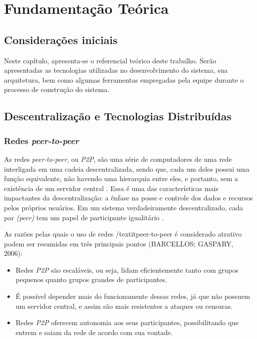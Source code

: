\chapter[Fundamentação Teórica]{Fundamentação Teórica}
\label{cap:fundamentacao}

\section{Considerações iniciais}
Neste capítulo, apresenta-se o referencial teórico deste trabalho. Serão apresentadas as tecnologias utilizadas no desenvolvimento do sistema, sua arquitetura, bem como algumas ferramentas empregadas pela equipe durante o processo de construção do sistema.

\section{Descentralização e Tecnologias Distribuídas}
\subsection{Redes \textit{peer-to-peer}}
As redes \textit{peer-to-peer}, ou \textit{P2P}, são uma série de computadores de uma rede interligada em uma cadeia descentralizada, sendo que, cada um deles possui uma função equivalente, não havendo uma hierarquia entre eles, e portanto, sem a existência de um servidor central \cite{otton2007}. Essa é uma das características mais impactantes da descentralização: a ênfase na posse e controle dos dados e recursos pelos próprios usuários. Em um sistema verdadeiramente descentralizado, cada par \textit{(peer)} tem um papel de participante igualitário \cite{oram2002}.

As razões pelas quais o uso de redes /textit{peer-to-peer} é considerado atrativo podem ser resumidas em três principais pontos (BARCELLOS; GASPARY, 2006): 

\begin{itemize}
    \item Redes \textit{P2P} são escaláveis, ou seja, lidam eficientemente tanto com grupos pequenos quanto grupos grandes de participantes. 
    \item É possível depender mais do funcionamente dessas redes, já que não possuem um servidor central, e assim são mais resistentes a ataques ou censuras.
    \item Redes \textit{P2P} oferecem autonomia aos seus participantes, possibilitando que entrem e saiam da rede de acordo com sua vontade. 
\end{itemize}

